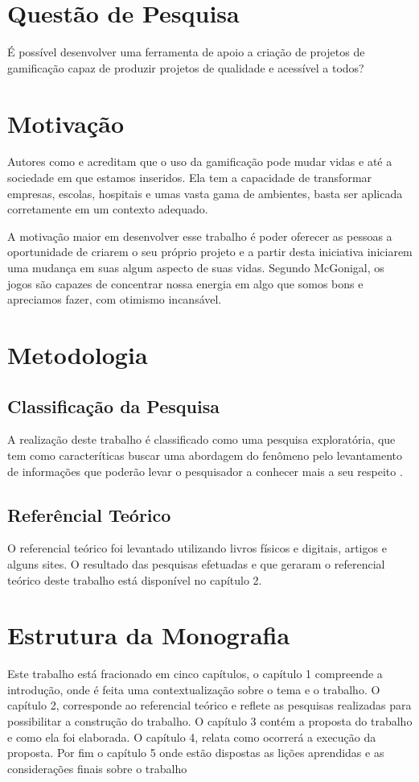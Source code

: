 \section{Questão de Pesquisa}

É possível desenvolver uma ferramenta de apoio a criação de projetos de gamificação capaz de produzir projetos de qualidade e acessível a todos?


\section{Motivação}

 Autores como \cite{chou2015actionable} e \cite{mcgonigal2011reality} acreditam que o uso da gamificação pode mudar vidas e até a sociedade em que estamos inseridos. Ela tem a capacidade de transformar empresas, escolas, hospitais e umas vasta gama de ambientes, basta ser aplicada corretamente em um contexto adequado. 

 A motivação maior em desenvolver esse trabalho é poder oferecer as pessoas a oportunidade de criarem o seu próprio projeto e a partir desta iniciativa iniciarem uma mudança em suas algum aspecto de suas vidas. Segundo McGonigal, os jogos são capazes de concentrar nossa energia em algo que somos bons e apreciamos fazer, com otimismo incansável.

\section{Metodologia}

\subsection{Classificação da Pesquisa}

A realização deste trabalho é classificado como uma pesquisa exploratória, que tem como caracteríticas buscar uma abordagem do fenômeno pelo levantamento de informações que poderão levar o pesquisador a conhecer mais a seu respeito \cite{gil2010metodos}. 

\subsection{Referêncial Teórico}

O referencial teórico foi levantado utilizando livros físicos e digitais, artigos e alguns sites. O resultado das pesquisas efetuadas e que geraram o referencial teórico deste trabalho está disponível no capítulo 2.

\section{Estrutura da Monografia}

Este trabalho está fracionado em cinco capítulos, o capítulo 1 compreende a introdução, onde é feita uma contextualização sobre o tema e o trabalho. O capítulo 2, corresponde ao referencial teórico e reflete as pesquisas realizadas para possibilitar a construção do trabalho.  O capítulo 3 contém a proposta do trabalho e como ela foi elaborada. O capítulo 4, relata como ocorrerá a execução da proposta. Por fim o capítulo 5 onde estão dispostas as lições aprendidas e as considerações finais sobre o trabalho
